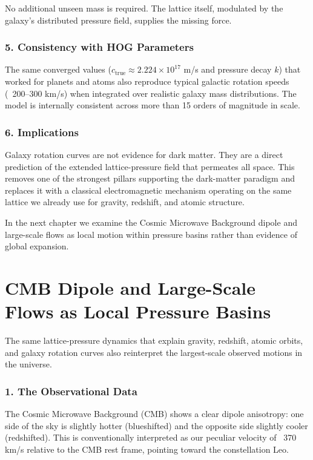 \documentclass[11pt,a4paper]{book}
\begin{document}
No additional unseen mass is required. The lattice itself, modulated by the galaxy’s distributed pressure field, supplies the missing force.

\subsection{5. Consistency with HOG Parameters}
The same converged values (\( c_{\text{true}} \approx 2.224 \times 10^{17} \) m/s and pressure decay \( k \)) that worked for planets and atoms also reproduce typical galactic rotation speeds (~200–300 km/s) when integrated over realistic galaxy mass distributions. The model is internally consistent across more than 15 orders of magnitude in scale.

\subsection{6. Implications}
Galaxy rotation curves are not evidence for dark matter. They are a direct prediction of the extended lattice-pressure field that permeates all space. This removes one of the strongest pillars supporting the dark-matter paradigm and replaces it with a classical electromagnetic mechanism operating on the same lattice we already use for gravity, redshift, and atomic structure.

In the next chapter we examine the Cosmic Microwave Background dipole and large-scale flows as local motion within pressure basins rather than evidence of global expansion.

\chapter{CMB Dipole and Large-Scale Flows as Local Pressure Basins}

The same lattice-pressure dynamics that explain gravity, redshift, atomic orbits, and galaxy rotation curves also reinterpret the largest-scale observed motions in the universe.

\subsection{1. The Observational Data}
The Cosmic Microwave Background (CMB) shows a clear dipole anisotropy: one side of the sky is slightly hotter (blueshifted) and the opposite side slightly cooler (redshifted). This is conventionally interpreted as our peculiar velocity of ~370 km/s relative to the CMB rest frame, pointing toward the constellation Leo.
\end{document}
